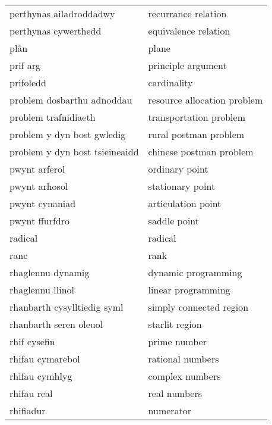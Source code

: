 \begin{supertabular}{p{0.22\textwidth}p{0.22\textwidth}}
         perthynas ailadroddadwy &               recurrance relation \\
            perthynas cywerthedd &              equivalence relation \\
                            plân &                             plane \\
                        prif arg &                principle argument \\
                       prifoledd &                       cardinality \\
      problem dosbarthu adnoddau &       resource allocation problem \\
            problem trafnidiaeth &            transportation problem \\
      problem y dyn bost gwledig &             rural postman problem \\
  problem y dyn bost tsieineaidd &           chinese postman problem \\
                   pwynt arferol &                    ordinary point \\
                   pwynt arhosol &                  stationary point \\
                  pwynt cynaniad &                articulation point \\
                  pwynt ffurfdro &                      saddle point \\
                         radical &                           radical \\
                            ranc &                              rank \\
               rhaglennu dynamig &               dynamic programming \\
                rhaglennu llinol &                linear programming \\
     rhanbarth cysylltiedig syml &           simply connected region \\
          rhanbarth seren oleuol &                    starlit region \\
                    rhif cysefin &                      prime number \\
                rhifau cymarebol &                  rational numbers \\
                  rhifau cymhlyg &                   complex numbers \\
                     rhifau real &                      real numbers \\
                       rhifiadur &                         numerator \\

\end{supertabular}
